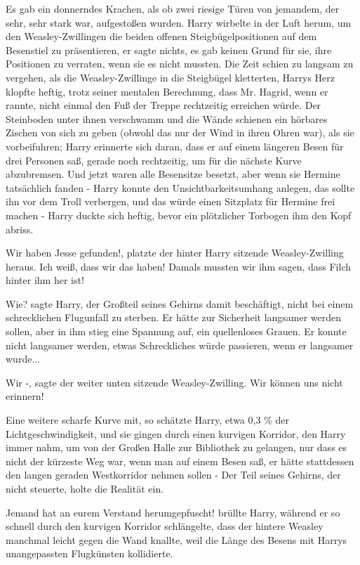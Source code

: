 Es gab ein donnerndes Krachen, als ob zwei riesige Türen von jemandem, der sehr,
sehr stark war, aufgestoßen wurden. Harry wirbelte in der Luft herum, um den
Weasley-Zwillingen die beiden offenen Steigbügelpositionen auf dem Besenstiel zu
präsentieren, er sagte nichts, es gab keinen Grund für sie, ihre Positionen zu
verraten, wenn sie es nicht mussten. Die Zeit schien zu langsam zu vergehen, als
die Weasley-Zwillinge in die Steigbügel kletterten, Harrys Herz klopfte heftig,
trotz seiner mentalen Berechnung, dass Mr. Hagrid, wenn er rannte, nicht einmal
den Fuß der Treppe rechtzeitig erreichen würde. Der Steinboden unter ihnen
verschwamm und die Wände schienen ein hörbares Zischen von sich zu geben (obwohl
das nur der Wind in ihren Ohren war), als sie vorbeifuhren; Harry erinnerte sich
daran, dass er auf einem längeren Besen für drei Personen saß, gerade noch
rechtzeitig, um für die nächste Kurve abzubremsen. Und jetzt waren alle
Besensitze besetzt, aber wenn sie Hermine tatsächlich fanden - Harry konnte den
Unsichtbarkeitsumhang anlegen, das sollte ihn vor dem Troll verbergen, und das
würde einen Sitzplatz für Hermine frei machen - Harry duckte sich heftig, bevor
ein plötzlicher Torbogen ihm den Kopf abriss.

\glqq Wir haben Jesse gefunden!\grqq{}, platzte der hinter Harry sitzende
Weasley-Zwilling heraus. \glqq Ich weiß, dass wir das haben! Damals mussten wir
ihm sagen, dass Filch hinter ihm her ist!\grqq{}

\glqq Wie?\grqq{} sagte Harry, der Großteil seines Gehirns damit beschäftigt,
nicht bei einem schrecklichen Flugunfall zu sterben. Er hätte zur Sicherheit
langsamer werden sollen, aber in ihm stieg eine Spannung auf, ein quellenloses
Grauen. Er konnte nicht langsamer werden, etwas Schreckliches würde passieren,
wenn er langsamer wurde...

\glqq Wir -\grqq{}, sagte der weiter unten sitzende Weasley-Zwilling. \glqq Wir
können uns nicht erinnern!\grqq{}

Eine weitere scharfe Kurve mit, so schätzte Harry, etwa 0,3 \% der
Lichtgeschwindigkeit, und sie gingen durch einen kurvigen Korridor, den Harry
immer nahm, um von der Großen Halle zur Bibliothek zu gelangen, nur dass es
nicht der kürzeste Weg war, wenn man auf einem Besen saß, er hätte stattdessen
den langen geraden Westkorridor nehmen sollen - Der Teil seines Gehirns, der
nicht steuerte, holte die Realität ein.

\glqq Jemand hat an eurem Verstand herumgepfuscht!\grqq{} brüllte Harry, während
er so schnell durch den kurvigen Korridor schlängelte, dass der hintere Weasley
manchmal leicht gegen die Wand knallte, weil die Länge des Besens mit Harrys
unangepassten Flugkünsten kollidierte.

